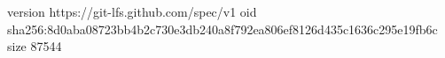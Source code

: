 version https://git-lfs.github.com/spec/v1
oid sha256:8d0aba08723bb4b2c730e3db240a8f792ea806ef8126d435c1636c295e19fb6c
size 87544
